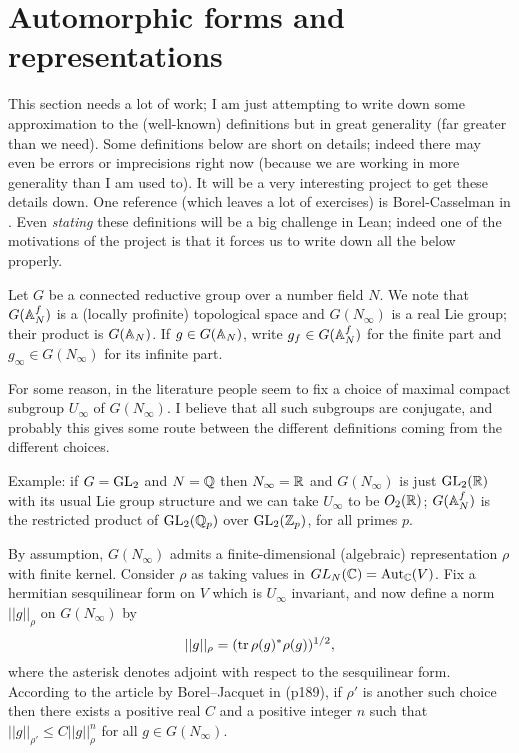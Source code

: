 \section{Automorphic forms and representations}

This section needs a lot of work; I am just attempting to write down some approximation to the (well-known) definitions but in great generality (far greater than we need). Some definitions below are short on details; indeed there may even be errors or imprecisions right now (because we are working in more generality than I am used to). It will be a very interesting project to get these details down. One reference (which leaves a lot of exercises) is Borel-Casselman in \cite{corvallis1}. Even \emph{stating} these definitions will be a big challenge in Lean; indeed one of the motivations of the project is that it forces us to write down all the below properly.

Let $G$ be a connected reductive group over a number field $N$.  We note
that $G(\mathbb{A}_N^f)$ is a (locally profinite) topological space and $G(N_\infty)$ is a real Lie group;
their product is $G(\mathbb{A}_N)$. If $g\in G(\mathbb{A}_N)$, write $g_f\in G(\mathbb{A}_N^f)$ for the finite part and $g_\infty\in G(N_\infty)$ for its infinite part.

For some reason, in the literature people seem to fix a choice of maximal compact subgroup $U_\infty$ of $G(N_\infty)$. I believe that all such subgroups are conjugate, and probably this gives some route between the different definitions coming from the different choices.

Example: if $G=\operatorname{GL}_2$ and $N=\mathbb{Q}$ then $N_\infty=\mathbb{R}$ and $G(N_\infty)$ is just $\operatorname{GL}_2(\mathbb{R})$ with its usual Lie group structure and we can take $U_\infty$ to be $O_2(\mathbb{R})$; $G(\mathbb{A}_N^f)$ is the restricted product of $\operatorname{GL}_2(\mathbb{Q}_p)$ over $\operatorname{GL}_2(\mathbb{Z}_p)$, for all primes $p$.

By assumption, $G(N_\infty)$ admits a finite-dimensional (algebraic) representation $\rho$ with finite kernel. Consider $\rho$ as taking values in $GL_N(\mathbb{C})=\operatorname{Aut}_{\mathbb{C}}(V)$. Fix a hermitian sesquilinear form on $V$ which 
is $U_\infty$ invariant, and now define a norm $||g||_\rho$ on $G(N_\infty)$ by $$||g||_\rho=(\operatorname{tr} \rho(g)^*\rho(g))^{1/2},$$ where the asterisk denotes adjoint with respect to the sesquilinear form. According to the article by Borel--Jacquet in \cite{corvallis1} (p189), if $\rho'$ is another such choice then there exists a positive real $C$ and a positive integer $n$ such that $||g||_{\rho'}\leq C||g||_\rho^n$ for all $g\in G(N_\infty)$.

